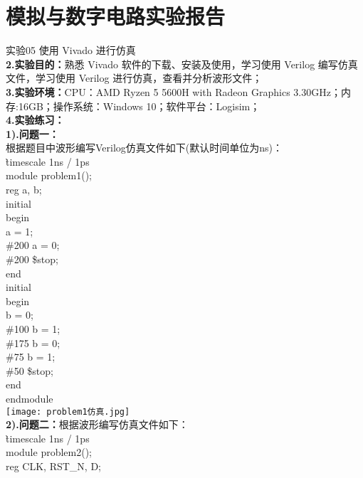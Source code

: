 \documentclass[12pt]{ctexart}
\begin{document}
\section*{模拟与数字电路实验报告}
实验05 使用 Vivado 进行仿真 \\
{\bf2.实验目的：}熟悉 Vivado 软件的下载、安装及使用，学习使用 Verilog 编写仿真文件，学习使用 Verilog 进行仿真，查看并分析波形文件；\\
{\bf3.实验环境：}CPU：AMD Ryzen 5 5600H with Radeon Graphics 3.30GHz；内存:16GB；操作系统：Windows 10；软件平台：Logisim；\\
{\bf4.实验练习：}\\
{\bf1).问题一：}\\
根据题目中波形编写Verilog仿真文件如下(默认时间单位为ns)：\\
\`timescale 1ns / 1ps\\
module problem1();\\
reg a, b;\\
initial\\
begin\\
\hspace*{0.5cm}a = 1;\\
\hspace*{0.5cm}\#200 a = 0;\\
\hspace*{0.5cm}\#200 \$stop;\\
end\\
initial\\
begin\\
\hspace*{0.5cm}b = 0;\\
\hspace*{0.5cm}\#100 b = 1;\\
\hspace*{0.5cm}\#175 b = 0;\\
\hspace*{0.5cm}\#75 b = 1;\\
\hspace*{0.5cm}\#50 \$stop;\\
end\\
endmodule\\
\texttt{[image: problem1仿真.jpg]}\\
{\bf2).问题二：}根据波形编写仿真文件如下：\\
\`timescale 1ns / 1ps\\
module problem2();\\
reg CLK, RST\_N, D;\\
\end{document}
